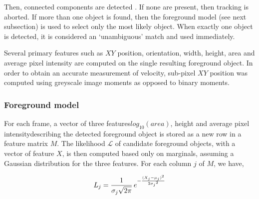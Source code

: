 

Then, connected components are detected . 
If none are present, then tracking is aborted. 
If more than one object is found, then the foreground model (see next subsection) is used to select only the most likely object.
When exactly one object is detected, it is considered an `unambiguous' match and used immediately.

Several primary features such as $XY$ position, orientation, width, height, area and average pixel intensity are computed on the single resulting foreground object.
In order to obtain an accurate measurement of velocity, sub-pixel $XY$ position was computed using greyscale image moments as opposed to binary moments.

\subsubsection{Foreground model}
For each frame, a vector of three features\emd{}$log_{10}(area)$, height and average pixel intensity\emd{}describing the detected foreground object is stored as a new row in a feature matrix $M$.
The likelihood $\mathcal{L}$ of candidate foreground objects, with a vector of feature $X$, is then computed based only on marginals, assuming a Gaussian distribution for the three features. 
For each column $j$ of $M$, we have,

\begin{equation}
{L_j = \frac{1}{\sigma_j\sqrt{2\pi}}\, e^{-\frac{(X_j - \mu_j)^2}{2 {\sigma_j}^2}}}
\end{equation}

